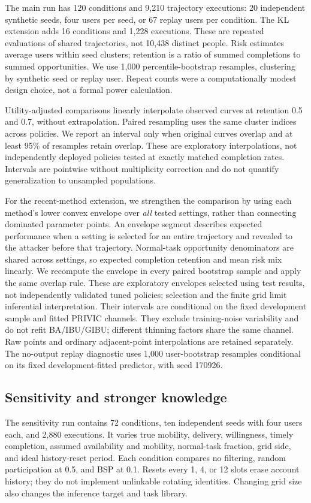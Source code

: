 \documentclass[review,12pt]{elsarticle}
\begin{document}
The main run has 120 conditions and 9,210 trajectory executions: 20 independent synthetic seeds, four users per seed, or 67 replay users per condition. The KL extension adds 16 conditions and 1,228 executions. These are repeated evaluations of shared trajectories, not 10,438 distinct people. Risk estimates average users within seed clusters; retention is a ratio of summed completions to summed opportunities. We use 1,000 percentile-bootstrap resamples, clustering by synthetic seed or replay user. Repeat counts were a computationally modest design choice, not a formal power calculation.

Utility-adjusted comparisons linearly interpolate observed curves at retention 0.5 and 0.7, without extrapolation. Paired resampling uses the same cluster indices across policies. We report an interval only when original curves overlap and at least 95\% of resamples retain overlap. These are exploratory interpolations, not independently deployed policies tested at exactly matched completion rates. Intervals are pointwise without multiplicity correction and do not quantify generalization to unsampled populations.

For the recent-method extension, we strengthen the comparison by using each method's lower convex envelope over \emph{all} tested settings, rather than connecting dominated parameter points. An envelope segment describes expected performance when a setting is selected for an entire trajectory and revealed to the attacker before that trajectory. Normal-task opportunity denominators are shared across settings, so expected completion retention and mean risk mix linearly. We recompute the envelope in every paired bootstrap sample and apply the same overlap rule. These are exploratory envelopes selected using test results, not independently validated tuned policies; selection and the finite grid limit inferential interpretation. Their intervals are conditional on the fixed development sample and fitted PRIVIC channels. They exclude training-noise variability and do not refit BA/IBU/GIBU; different thinning factors share the same channel. Raw points and ordinary adjacent-point interpolations are retained separately. The no-output replay diagnostic uses 1,000 user-bootstrap resamples conditional on its fixed development-fitted predictor, with seed 170926.

\subsection{Sensitivity and stronger knowledge}
The sensitivity run contains 72 conditions, ten independent seeds with four users each, and 2,880 executions. It varies true mobility, delivery, willingness, timely completion, assumed availability and mobility, normal-task fraction, grid side, and ideal history-reset period. Each condition compares no filtering, random participation at 0.5, and BSP at 0.1. Resets every 1, 4, or 12 slots erase account history; they do not implement unlinkable rotating identities. Changing grid size also changes the inference target and task library.
\end{document}
